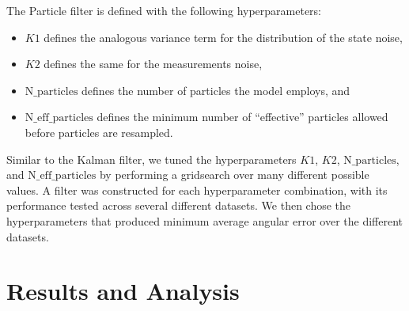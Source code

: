 \documentclass[11pt]{amsart}
\begin{document}
The Particle filter is defined with the following hyperparameters: 
\begin{itemize}
    \item $K1$ defines the analogous variance term for the distribution of the state noise,
    \item $K2$ defines the same for the measurements noise,
    \item $\text{N\_particles}$ defines the number of particles the model employs, and
    \item $\text{N\_eff\_particles}$ defines the minimum number of “effective” particles allowed before particles are resampled.
\end{itemize}

Similar to the Kalman filter, we tuned the hyperparameters $K1$, $K2$, $\text{N\_particles}$, and $\text{N\_eff\_particles}$ by performing a gridsearch over many different possible values. A filter was constructed for each hyperparameter combination, with its performance 
tested across several different datasets. We then chose the hyperparameters that produced minimum average angular error over the different datasets. 

\section{Results and Analysis}
\end{document}
